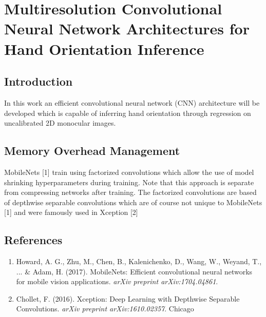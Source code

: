 \documentclass{article}
\begin{document}
\section*{Multiresolution Convolutional Neural Network Architectures for Hand Orientation Inference}

\subsection*{Introduction}
In this work an efficient convolutional neural network (CNN)
architecture will be developed which is capable of inferring hand orientation through regression on uncalibrated 2D monocular images.

\subsection*{Memory Overhead Management}
MobileNets [1] train using factorized convolutions which allow the use of model shrinking hyperparameters during training. Note that this approach is separate from compressing networks after training. The factorized convolutions are based of depthwise separable convolutions which are of course not unique to MobileNets [1] and were famously used in Xception [2]

\subsection*{References}
\begin{enumerate}
\item Howard, A. G., Zhu, M., Chen, B., Kalenichenko, D., Wang, W., Weyand, T., ... \& Adam, H. (2017). MobileNets: Efficient convolutional neural networks for mobile vision applications. \emph{arXiv preprint arXiv:1704.04861}.
\item Chollet, F. (2016). Xception: Deep Learning with Depthwise Separable Convolutions. \emph{arXiv preprint arXiv:1610.02357}.
Chicago	
\end{enumerate}
\end{document}
